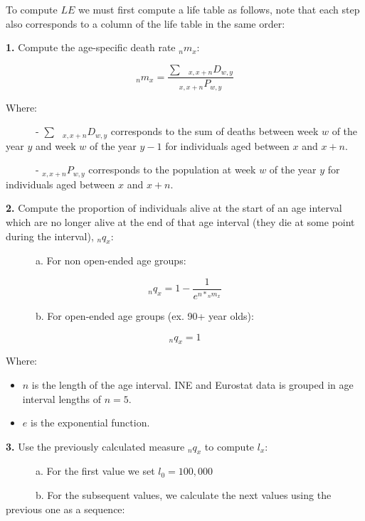 \documentclass[
  a4paper]{article}
\begin{document}
To compute \(LE\) we must first compute a life table as follows, note
that each step also corresponds to a column of the life table in the
same order:

\textbf{1.} Compute the age-specific death rate \({}_{n}m_{x}\):

\begin{equation}
{}_{n}m_{x} = \frac{\sum \text{ } {}_{x,x+n}D_{w,y}}{{}_{x,x+n}P_{w,y}}
\end{equation}

Where:

~~~~~~- \(\sum \text{ } {}_{x,x+n}D_{w,y}\) corresponds to the sum of
deaths between week \(w\) of the year \(y\) and week \(w\) of the year
\(y-1\) for individuals aged between \(x\) and \(x+n\).

~~~~~~- \({}_{x,x+n}P_{w,y}\) corresponds to the population at week
\(w\) of the year \(y\) for individuals aged between \(x\) and \(x+n\).

\textbf{2.} Compute the proportion of individuals alive at the start of
an age interval which are no longer alive at the end of that age
interval (they die at some point during the interval), \({}_{n}q_{x}\):

~~~~~~a. For non open-ended age groups:

\begin{equation}
\tag{2.1}
{}_{n}q_{x} = 1 - \frac{1}{e^{n * {}_{n}m_{x}}}
\end{equation}

~~~~~~b. For open-ended age groups (ex. 90+ year olds):

\begin{equation}
\tag{2.2}
{}_{n}q_{x} = 1
\end{equation}

Where:

\begin{itemize}
\item
  \(n\) is the length of the age interval. INE and Eurostat data is
  grouped in age interval lengths of \(n = 5\).
\item
  \(e\) is the exponential function.
\end{itemize}

\textbf{3.} Use the previously calculated measure \({}_{n}q_{x}\) to
compute \(l_x\):

~~~~~~a. For the first value we set \(l_0 = 100,000\)

~~~~~~b. For the subsequent values, we calculate the next values using
the previous one as a sequence:
\end{document}
